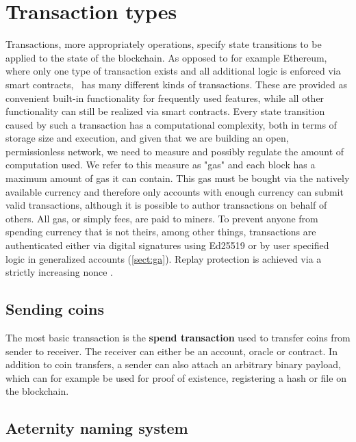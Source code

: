 \section{Transaction types}
\label{sect:transactions}

Transactions, more appropriately operations, specify state transitions to
be applied to the state of the blockchain. As opposed to for example Ethereum,
where only one type of transaction exists and all additional logic is enforced
via smart contracts, \aet\ has many different kinds of transactions.
These are provided as convenient built-in functionality for frequently used
features, while all other functionality can still be realized via smart
contracts.
Every state transition caused by such a transaction has a computational
complexity, both in terms of storage size and execution, and given that we are
building an open, permissionless network, we need to measure and possibly
regulate the amount of computation used. We refer to this measure as "gas" and
each block has a maximum amount of gas it can contain.
This gas must be bought via the natively available currency and therefore only
accounts with enough currency can submit valid transactions, although it is
possible to author transactions on behalf of others. All gas, or simply fees,
are paid to miners.
To prevent anyone from spending currency that is not theirs, among other
things, transactions are authenticated either via digital signatures using
Ed25519 \cite{bernstein2012high, bernstein2006curve25519} or by user specified
logic in generalized accounts (\ref{sect:ga}).
Replay protection is achieved via a strictly increasing nonce \cite{Syverson}.

\subsection{Sending coins}
\label{sect:aespend}

The most basic transaction is the \textbf{spend transaction} used to
transfer coins from sender to receiver. The receiver can either be an account,
oracle or contract.
In addition to coin transfers, a sender can also attach an arbitrary binary
payload, which can for example be used for proof of existence, registering a
hash or file on the blockchain.


\subsection{Aeternity naming system}
\label{sect:aens}

